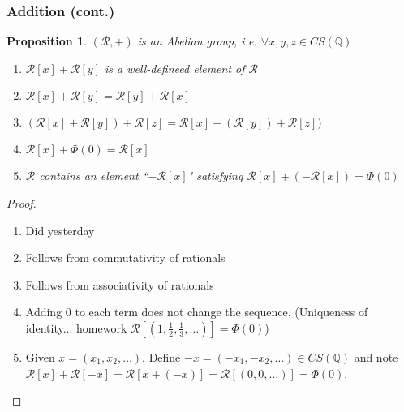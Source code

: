 \documentclass{article}
\theoremstyle{plain}
\newtheorem{proposition}{Proposition}
\theoremstyle{remark}
\newcommand{\Q}{{\mathbb Q}}
\begin{document}
\subsubsection{Addition (cont.)}
\begin{proposition}
	$(\mathcal{R},+)$ is an Abelian group, i.e. $\forall x,y,z \in CS(\Q)$
	\begin{enumerate}
		\item $\mathcal{R}[x] + \mathcal{R}[y]$ is a well-defineed element of $\mathcal{R}$
		\item $\mathcal{R}[x] + \mathcal{R}[y] = \mathcal{R}[y] + \mathcal{R}[x]$
		\item $(\mathcal{R}[x] + \mathcal{R}[y]) + \mathcal{R}[z]
			= \mathcal{R}[x] + (\mathcal{R}[y]) + \mathcal{R}[z])$
		\item $\mathcal{R}[x] + \Phi(0) = \mathcal{R}[x]$
		\item $\mathcal{R}$ contains an element ``$-\mathcal{R}[x]$"
			satisfying $\mathcal{R}[x] + (-\mathcal{R}[x]) = \Phi(0)$
	\end{enumerate}
\end{proposition}
\begin{proof}
	\begin{enumerate}
		\item Did yesterday
		\item Follows from commutativity of rationals
		\item Follows from associativity of rationals
		\item Adding $0$ to each term does not change the sequence.
			(Uniqueness of identity... homework
			$\mathcal{R}[(1,\frac{1}{2},\frac{1}{3},\dots)] = \Phi(0)$)
		\item Given $x = (x_1,x_2,\dots)$.
			Define $-x = (-x_1,-x_2,\dots) \in CS(\Q)$
			and note $\mathcal{R}[x] + \mathcal{R}[-x] =
			\mathcal{R}[x+(-x)] = \mathcal{R}[(0,0,\dots)] = \Phi(0)$.
	\end{enumerate}
\end{proof}
\end{document}
